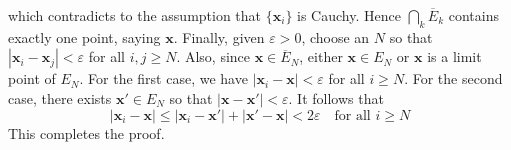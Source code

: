 \documentclass[12pt]{article}
\theoremstyle{definition}
\begin{document}
which contradicts to the assumption that $\{\mathbf{x}_i\}$ is Cauchy. Hence $\bigcap_{k} \overline{E}_k$ contains exactly one point, saying $\mathbf{x}$. Finally, given $\varepsilon>0$, choose an $N$ so that $\left\vert\mathbf{x}_i-\mathbf{x}_j\right\vert<\varepsilon$ for all $i,j\ge N$. Also, since $\mathbf{x}\in\overline{E}_N$, either $\mathbf{x}\in E_N$ or $\mathbf{x}$ is a limit point of $E_N$. For the first case, we have $\left\vert\mathbf{x}_i-\mathbf{x}\right\vert<\varepsilon$ for all $i\ge N$. For the second case, there exists $\mathbf{x}'\in E_N$ so that $\left\vert\mathbf{x}-\mathbf{x}'\right\vert<\varepsilon$. It follows that
$$
\left\vert\mathbf{x}_i-\mathbf{x}\right\vert
\le \left\vert\mathbf{x}_i-\mathbf{x}'\right\vert
+\left\vert\mathbf{x}'-\mathbf{x}\right\vert
<2\varepsilon\quad \mbox{for all $i\ge N$}
$$
This completes the proof.
\end{document}
